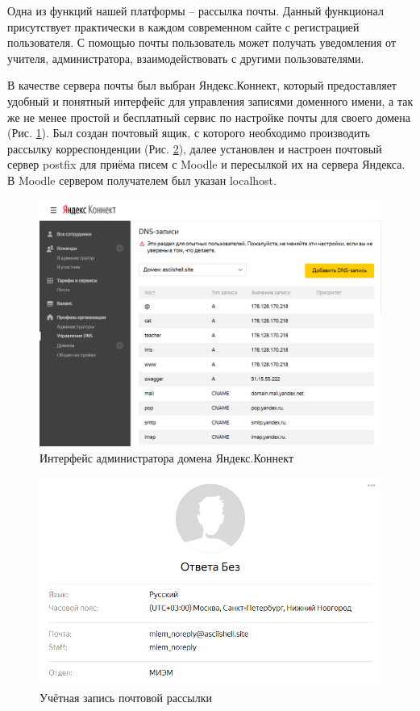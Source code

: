 \documentclass[a4paper,14pt]{article}
\begin{document}
Одна из функций нашей платформы -- рассылка почты.
Данный функционал присутствует практически в каждом современном сайте с регистрацией пользователя.
С помощью почты пользователь может получать уведомления от учителя, администратора, взаимодействовать с другими пользователями.

В качестве сервера почты был выбран Яндекс.Коннект, который предоставляет удобный и понятный интерфейс для управления записями доменного имени, а так же не менее простой и бесплатный сервис по настройке почты для своего домена (Рис. \ref{img:yandex}).
Был создан почтовый ящик, с которого необходимо производить рассылку корреспонденции (Рис. \ref{img:miemMail}), далее установлен и настроен почтовый сервер postfix для приёма писем с Moodle и пересылкой их на сервера Яндекса.
В Moodle сервером получателем был указан localhost.

\begin{figure}[H]
	\centering
	\includegraphics[width=0.7\linewidth]{image/yandex_connect}
	\caption{Интерфейс администратора домена Яндекс.Коннект}
	\label{img:yandex}
\end{figure}

\begin{figure}[H]
	\centering
	\includegraphics[width=0.7\linewidth]{image/yandex_miem}
	\caption{Учётная запись почтовой рассылки}
	\label{img:miemMail}
\end{figure}
\end{document}
